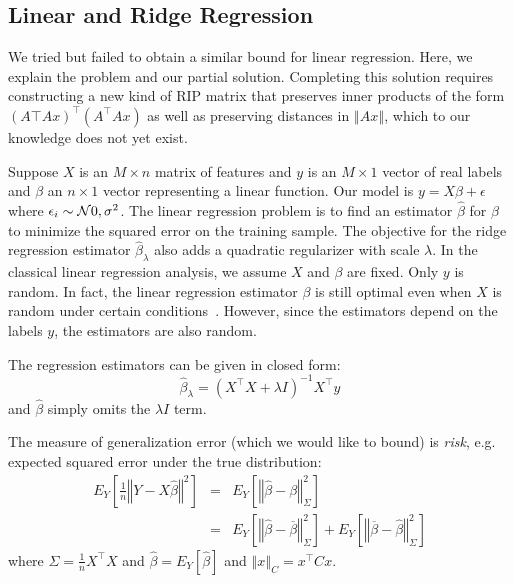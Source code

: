 \documentclass[english]{article}
\theoremstyle{plain}
\begin{document}
\subsection{Linear and Ridge Regression}
We tried but failed to obtain a similar bound for linear regression.
Here, we explain the problem and our partial solution.
Completing this solution requires constructing a new kind of RIP matrix that preserves inner products of the form $(A\top A x)^\top (A^\top A x)$ as well as preserving distances in $\left\Vert Ax \right\Vert$, which to our knowledge does not yet exist.

Suppose $X$ is an $M \times n$ matrix of features and $y$ is an $M \times 1$ vector of real labels and $\beta$ an $n \times 1$ vector representing a linear function.
Our model is $y = X\beta + \epsilon$ where $\epsilon_i \sim {\cal N}{0,\sigma^2}$.
The linear regression problem is to find an estimator $\widehat{\beta}$ for $\beta$ to minimize the squared error on the training sample.
The objective for the ridge regression estimator $\widehat{\beta}_\lambda$ also adds a quadratic regularizer with scale $\lambda$.
In the classical linear regression analysis, we assume $X$ and $\beta$ are fixed. Only $y$ is random.
In fact, the linear regression estimator $\beta$ is still optimal even when $X$ is random under certain conditions~\citep{Shaffer1991}.
However, since the estimators depend on the labels $y$, the estimators are also random.

The regression estimators can be given in closed form:
\[
\widehat{\beta}_\lambda = (X^\top X + \lambda I)^{-1} X^\top y
\]
and $\widehat{\beta}$ simply omits the $\lambda I$ term.

The measure of generalization error (which we would like to bound) is \emph{risk}, e.g. expected squared error under the true distribution:
\begin{eqnarray*}
E_{Y}\left[\frac{1}{n}\left\Vert Y-X\widehat{\beta}\right\Vert ^{2}\right] & = & E_{Y}\left[\left\Vert \widehat{\beta}-\beta\right\Vert _{\Sigma}^{2}\right]\\
& = & E_{Y}\left[\left\Vert \widehat{\beta}-\overline{\beta}\right\Vert _{\Sigma}^{2}\right] + E_{Y}\left[\left\Vert \overline{\beta}-\widehat{\beta}\right\Vert _{\Sigma}^{2}\right]
\end{eqnarray*}
where $\Sigma = \frac{1}{n} X^\top X$ and $\widehat{\beta} = E_Y[\widehat{\beta}]$ and $\left\Vert x \right\Vert_C = x^\top C x$.
\end{document}
